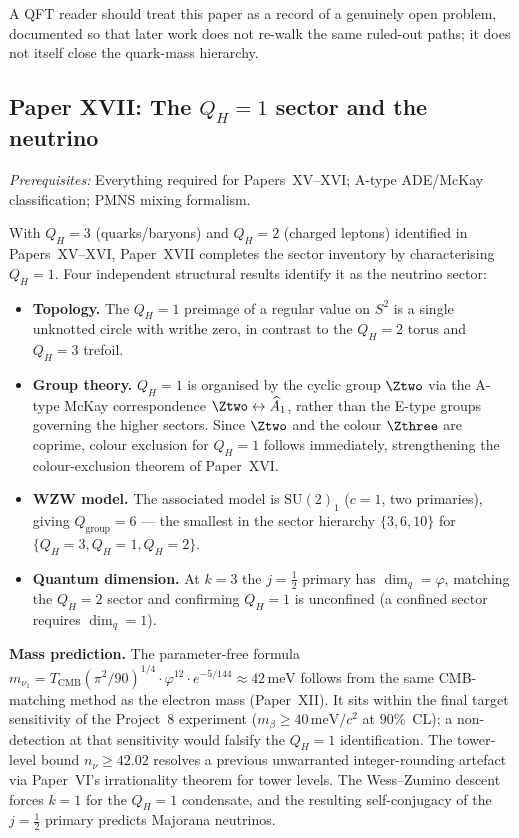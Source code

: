 \documentclass[11pt,a4paper]{article}
\newcommand{\vp}{\varphi}
\newcommand{\TCMB}{T_{\mathrm{CMB}}}
\begin{document}
A QFT reader should treat this paper as a record of a genuinely open
problem, documented so that later work does not re-walk the same ruled-out
paths; it does not itself close the quark-mass hierarchy.

\subsection{Paper XVII: The $Q_H=1$ sector and the neutrino}

\textit{Prerequisites:} Everything required for Papers~XV--XVI; A-type
ADE/McKay classification; PMNS mixing formalism.

With $Q_H=3$ (quarks/baryons) and $Q_H=2$ (charged leptons) identified in
Papers~XV--XVI, Paper~XVII completes the sector inventory by
characterising $Q_H=1$. Four independent structural results identify it
as the neutrino sector:

\begin{itemize}[noitemsep]
\item \textbf{Topology.} The $Q_H=1$ preimage of a regular value on $S^2$
  is a single unknotted circle with writhe zero, in contrast to the
  $Q_H=2$ torus and $Q_H=3$ trefoil.
\item \textbf{Group theory.} $Q_H=1$ is organised by the cyclic group
  $\Ztwo$ via the A-type McKay correspondence
  $\Ztwo\leftrightarrow\widehat{A}_1$, rather than the E-type groups
  governing the higher sectors. Since $\Ztwo$ and the colour $\Zthree$
  are coprime, colour exclusion for $Q_H=1$ follows immediately,
  strengthening the colour-exclusion theorem of Paper~XVI.
\item \textbf{WZW model.} The associated model is $\mathrm{SU}(2)_1$
  ($c=1$, two primaries), giving $Q_{\mathrm{group}}=6$ --- the smallest
  in the sector hierarchy $\{3,6,10\}$ for $\{Q_H=3,Q_H=1,Q_H=2\}$.
\item \textbf{Quantum dimension.} At $k=3$ the $j=\tfrac12$ primary has
  $\dim_q=\vp$, matching the $Q_H=2$ sector and confirming $Q_H=1$ is
  unconfined (a confined sector requires $\dim_q=1$).
\end{itemize}

\textbf{Mass prediction.} The parameter-free formula
$m_{\nu_1} = \TCMB(\pi^2/90)^{1/4}\cdot\vp^{12}\cdot e^{-5/144}
\approx 42\,\mathrm{meV}$ follows from the same CMB-matching method as
the electron mass (Paper~XII). It sits within the final target
sensitivity of the Project~8 experiment ($m_\beta\geq40\,\mathrm{meV}/c^2$
at $90\%$~CL); a non-detection at that sensitivity would falsify the
$Q_H=1$ identification. The tower-level bound $n_\nu\geq42.02$ resolves
a previous unwarranted integer-rounding artefact via Paper~VI's
irrationality theorem for tower levels. The Wess--Zumino descent forces
$k=1$ for the $Q_H=1$ condensate, and the resulting self-conjugacy of
the $j=\tfrac12$ primary predicts Majorana neutrinos.
\end{document}
